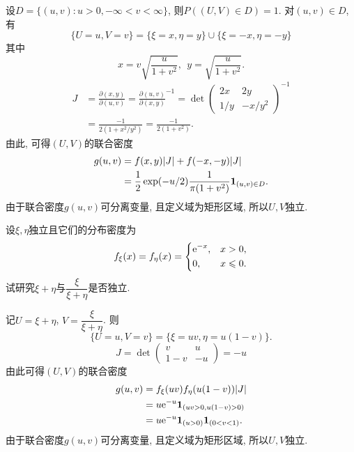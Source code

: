 \begin{yyProof}
	设$D = \{(u,v):u>0,-\infty<v<\infty\}$, 则$P((U,V)\in D) = 1$.
	对$(u,v)\in D$, 有
	\begin{equation}
		\{U = u,V = v\} = \{\xi = x,\eta = y\}\cup \{\xi = -x,\eta = -y\}
	\end{equation}
	其中\begin{equation}
		x = v\sqrt{\frac{u}{1+v^2}},~~y = \sqrt{\frac{u}{1+v^2}}.
	\end{equation}
	\begin{align}
		J &= \frac{\partial(x,y)}{\partial(u,v)} = \frac{\partial(u,v)}{\partial(x,y)}^{-1} = \det\begin{pmatrix}
				2x & 2y \\ 1/y & -x/y^2
			\end{pmatrix}^{-1}\nonumber\\
		&=\frac{-1}{2(1+x^2/y^2)} = \frac{-1}{2(1+v^2)}.
	\end{align}
	由此, 可得$(U,V)$的联合密度
	\begin{align}
		g(u,v) &= f(x,y)\lvert J\rvert + f(-x,-y)\lvert J\rvert\nonumber\\
		&= \frac{1}{2}\exp(-u/2)\frac{1}{\pi(1+v^2)}\bm{1}_{(u,v)\in D}.
	\end{align}
	由于联合密度$g(u,v)$可分离变量, 且定义域为矩形区域, 所以$U,V$独立.
\end{yyProof}

\begin{yyEx}
	设$\xi,\eta$独立且它们的分布密度为\begin{equation}
	f_{\xi}(x) = f_{\eta}(x) = \begin{dcases}
	\mathrm{e}^{-x},&x>0,\\
	0,&x\leqslant 0.
	\end{dcases}
	\end{equation}
	试研究$\xi+\eta$与$\dfrac{\xi}{\xi+\eta}$是否独立.
\end{yyEx}

\begin{yySolution}
	记$U = \xi+\eta$, $V = \dfrac{\xi}{\xi+\eta}$. 则
	\begin{equation}
		\{U = u,V = v\} = \{\xi = uv, \eta = u(1-v)\}.
	\end{equation}
	\begin{equation}
		J = \det\begin{pmatrix}
			v & u \\
			1-v & -u
		\end{pmatrix} = -u
	\end{equation}
	由此可得$(U,V)$的联合密度\begin{align}
		g(u,v) &= f_\xi(uv)f_\eta(u(1-v))\lvert J\rvert\nonumber\\
		&= u\mathrm{e}^{-u}\bm{1}_{(uv>0,u(1-v)>0)}\nonumber\\
		&= u\mathrm{e}^{-u}\bm{1}_{(u>0)}\bm{1}_{(0<v<1)}.
	\end{align}
	由于联合密度$g(u,v)$可分离变量, 且定义域为矩形区域, 所以$U,V$独立.
\end{yySolution}

